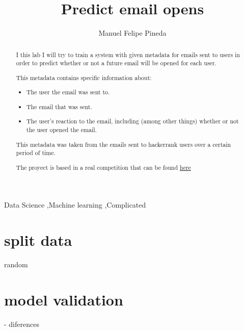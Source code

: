 \documentclass[preprint,12pt]{elsarticle}
\begin{document}
\begin{frontmatter}


\title{Predict email opens}

\author{Manuel Felipe Pineda}

\address{Universidad Tecnologica de Pereira}

\begin{abstract}
  I this lab I will try to train a system with given
  metadata for emails sent to users in order to predict whether
  or not a future email will be opened for each user.

  This metadata contains specific information about:

  \begin{itemize}
    \item The user the email was sent to.
    \item The email that was sent.
    \item The user's reaction to the email, including
      (among other things) whether or not the user
      opened the email.
  \end{itemize}

  This metadata was taken from the emails sent to
  hackerrank users over a certain period of time.

  The proyect is based in a real competition that can be found
  \href{https://www.hackerrank.com/contests/machine-learning-codesprint/challenges/hackerrank-predict-email-opens}{here}
\end{abstract}

\begin{keyword}
Data Science \sep Machine learning \sep Complicated


\end{keyword}

\end{frontmatter}


\section{split data}
\label{split:1}
random

\section{model validation}
- diferences
\end{document}

